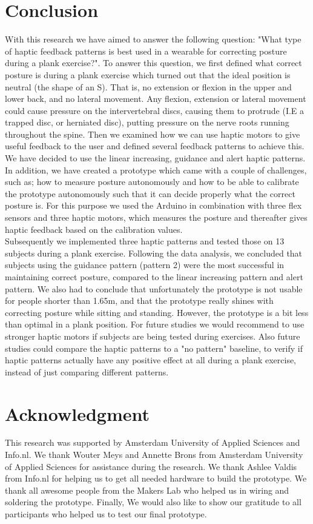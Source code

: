\documentclass[sigconf]{acmart}
\begin{document}
\section{Conclusion}

With this research we have aimed to answer the following question: "What type of haptic feedback patterns is best used in a wearable for correcting posture during a plank exercise?".  
To answer this question, we first defined what correct posture is during a plank exercise which turned out that the ideal position is neutral (the shape of an S). That is, no extension or flexion in the upper and lower back, and no lateral movement. Any flexion, extension or lateral movement could cause pressure on the intervertebral discs, causing them to protrude (I.E a trapped disc, or herniated disc), putting pressure on the nerve roots running throughout the spine. 
Then we examined how we can use haptic motors to give useful feedback to the user and defined several feedback patterns to achieve this. We have decided to use the linear increasing, guidance and alert haptic patterns.  
In addition, we have created a prototype which came with a couple of challenges, such as; how to measure posture autonomously and how to be able to calibrate the prototype autonomously such that it can decide properly what the correct posture is. For this purpose we used the Arduino in combination with three flex sensors and three haptic motors, which measures the posture and thereafter gives haptic feedback based on the calibration values.\\  
Subsequently we implemented three haptic patterns and tested those on 13 subjects during a plank exercise. Following the data analysis, we concluded that subjects using the guidance pattern (pattern 2) were the most successful in maintaining correct posture, compared to the linear increasing pattern and alert pattern. We also had to conclude that unfortunately the prototype is not usable for people shorter than 1.65m, and that the prototype really shines with correcting posture while sitting and standing. However, the prototype is a bit less than optimal in a plank position. 
For future studies we would recommend to use stronger haptic motors if subjects are being tested during exercises. Also future studies could compare the haptic patterns to a "no pattern" baseline, to verify if haptic patterns actually have any positive effect at all during a plank exercise, instead of just comparing different patterns.

\section{Acknowledgment}
This research was supported by Amsterdam University of Applied Sciences and Info.nl. 
We thank Wouter Meys and Annette Brons from Amsterdam University of Applied Sciences for assistance during the research.
We thank Ashlee Valdis from Info.nl for helping us to get all needed hardware to build the prototype. 
We thank all awesome people from the Makers Lab who helped us in wiring and soldering the prototype. 
Finally, We would also like to show our gratitude to all participants who helped us to test our final prototype. 





\end{document}

